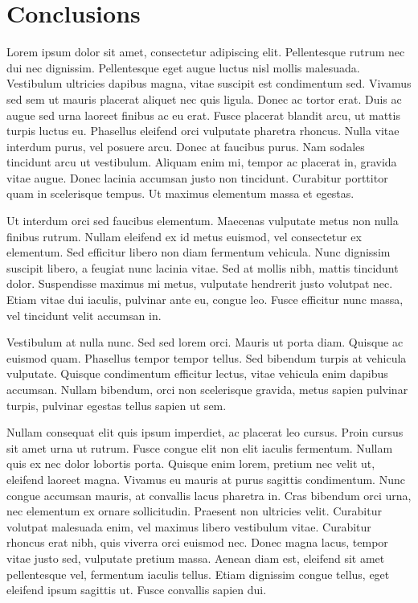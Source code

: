 
\chapter{Conclusions}

Lorem ipsum dolor sit amet, consectetur adipiscing elit. Pellentesque rutrum nec dui nec dignissim. Pellentesque eget augue luctus nisl mollis malesuada. Vestibulum ultricies dapibus magna, vitae suscipit est condimentum sed. Vivamus sed sem ut mauris placerat aliquet nec quis ligula. Donec ac tortor erat. Duis ac augue sed urna laoreet finibus ac eu erat. Fusce placerat blandit arcu, ut mattis turpis luctus eu. Phasellus eleifend orci vulputate pharetra rhoncus. Nulla vitae interdum purus, vel posuere arcu. Donec at faucibus purus. Nam sodales tincidunt arcu ut vestibulum. Aliquam enim mi, tempor ac placerat in, gravida vitae augue. Donec lacinia accumsan justo non tincidunt. Curabitur porttitor quam in scelerisque tempus. Ut maximus elementum massa et egestas.

Ut interdum orci sed faucibus elementum. Maecenas vulputate metus non nulla finibus rutrum. Nullam eleifend ex id metus euismod, vel consectetur ex elementum. Sed efficitur libero non diam fermentum vehicula. Nunc dignissim suscipit libero, a feugiat nunc lacinia vitae. Sed at mollis nibh, mattis tincidunt dolor. Suspendisse maximus mi metus, vulputate hendrerit justo volutpat nec. Etiam vitae dui iaculis, pulvinar ante eu, congue leo. Fusce efficitur nunc massa, vel tincidunt velit accumsan in.

Vestibulum at nulla nunc. Sed sed lorem orci. Mauris ut porta diam. Quisque ac euismod quam. Phasellus tempor tempor tellus. Sed bibendum turpis at vehicula vulputate. Quisque condimentum efficitur lectus, vitae vehicula enim dapibus accumsan. Nullam bibendum, orci non scelerisque gravida, metus sapien pulvinar turpis, pulvinar egestas tellus sapien ut sem.

Nullam consequat elit quis ipsum imperdiet, ac placerat leo cursus. Proin cursus sit amet urna ut rutrum. Fusce congue elit non elit iaculis fermentum. Nullam quis ex nec dolor lobortis porta. Quisque enim lorem, pretium nec velit ut, eleifend laoreet magna. Vivamus eu mauris at purus sagittis condimentum. Nunc congue accumsan mauris, at convallis lacus pharetra in. Cras bibendum orci urna, nec elementum ex ornare sollicitudin. Praesent non ultricies velit. Curabitur volutpat malesuada enim, vel maximus libero vestibulum vitae. Curabitur rhoncus erat nibh, quis viverra orci euismod nec. Donec magna lacus, tempor vitae justo sed, vulputate pretium massa. Aenean diam est, eleifend sit amet pellentesque vel, fermentum iaculis tellus. Etiam dignissim congue tellus, eget eleifend ipsum sagittis ut. Fusce convallis sapien dui.

